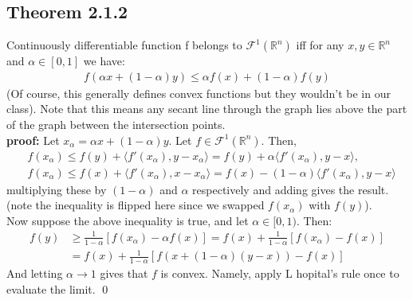 \documentclass[12pt,a4paper]{article}
\begin{document}
	\subsection*{Theorem 2.1.2}\label{thm212}
	Continuously differentiable function f belongs to $\mathcal{F}^1(\mathbb{R}^n)$ iff for any $x, y \in \mathbb{R}^n$ and $\alpha \in [0,1]$ we have:
	\begin{align*}
		f(\alpha x + (1 - \alpha)y) \leq \alpha f(x) + (1 - \alpha)f(y)
	\end{align*}
	(Of course, this generally defines convex functions but they wouldn't be in our class). Note that this means any secant line through the graph lies above the part of the graph between the intersection points.\\
	\textbf{proof:} Let $x_{\alpha} = \alpha x + (1 - \alpha)y$. Let $f \in \mathcal{F}^1(\mathbb{R}^n)$. Then,
	\begin{align*}
		&f(x_\alpha) \leq f(y) + \langle f'(x_\alpha), y - x_\alpha \rangle = f(y) + \alpha \langle f'(x_\alpha), y - x \rangle , \\
		&f(x_\alpha) \leq f(x) + \langle f'(x_\alpha), x - x_\alpha \rangle = f(x) - (1 - \alpha)\langle f'(x_\alpha), y - x \rangle
	\end{align*}
	multiplying these by $(1-\alpha)$ and $\alpha$ respectively and adding gives the result. (note the inequality is flipped here since we swapped $f(x_\alpha)$ with $f(y)$). \\
	Now suppose the above inequality is true, and let $\alpha \in [0,1)$. Then:
	\begin{align*}
		f(y) &\geq \frac{1}{1 - \alpha}[f(x_\alpha) - \alpha f(x)] = f(x) + \frac{1}{1 - \alpha}[f(x_\alpha) - f(x)] \\
		&= f(x) + \frac{1}{1 - \alpha}[f(x + (1- \alpha)(y - x)) - f(x)]
	\end{align*}
	And letting $\alpha \rightarrow 1$ gives that $f$ is convex. Namely, apply L
	hopital's rule once to evaluate the limit. \qed \\
\end{document}
